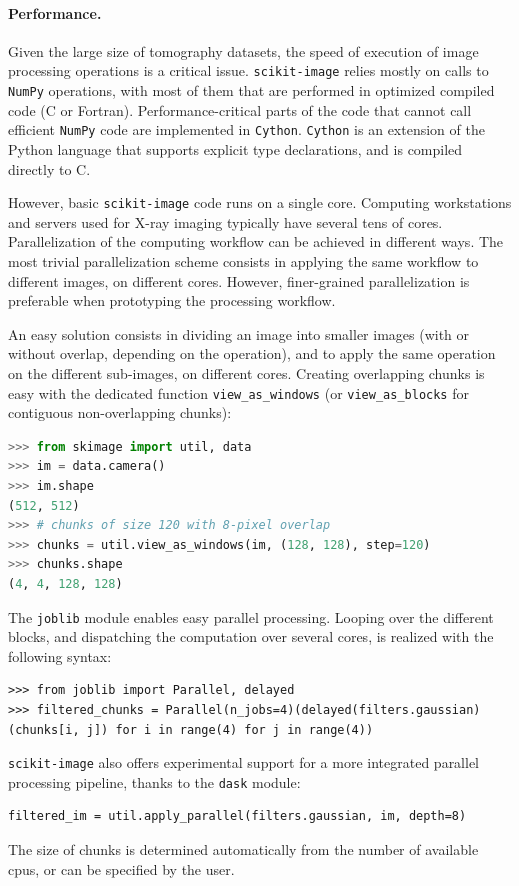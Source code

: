 \documentclass[twocolumn]{bmcart}%
\begin{document}
\paragraph{Performance.}

Given the large size of tomography datasets, the speed of execution of image
processing operations is a critical issue. \texttt{scikit-image} relies mostly
on calls to \texttt{NumPy} operations, with most of them that are performed in
optimized compiled code (C or Fortran). Performance-critical parts of the code
that cannot call efficient \texttt{NumPy} code are implemented in
\texttt{Cython}. \texttt{Cython} \citep{Behnel2011} is an extension of the
Python language that supports explicit type declarations, and is compiled
directly to C. 

However, basic \texttt{scikit-image} code runs on a single core. Computing
workstations and servers used for X-ray imaging typically have several tens of
cores. Parallelization of the computing workflow can be achieved in different
ways. The most trivial parallelization scheme consists in applying the same
workflow to different images, on different cores. However, finer-grained
parallelization is preferable when prototyping the processing workflow.


An easy solution consists in dividing an image into smaller images (with
or without overlap, depending on the operation), and to apply the
same operation on the different sub-images, on different cores. Creating overlapping chunks is easy with the dedicated function \texttt{view\_as\_windows} (or \texttt{view\_as\_blocks} for contiguous non-overlapping chunks):
\begin{lstlisting}[language=Python]
>>> from skimage import util, data
>>> im = data.camera()
>>> im.shape
(512, 512)
>>> # chunks of size 120 with 8-pixel overlap
>>> chunks = util.view_as_windows(im, (128, 128), step=120)
>>> chunks.shape
(4, 4, 128, 128)
\end{lstlisting}
The \texttt{joblib} module enables easy parallel processing. Looping over the different blocks, and dispatching the computation over several cores, is realized with the following syntax:  
\begin{lstlisting}
>>> from joblib import Parallel, delayed
>>> filtered_chunks = Parallel(n_jobs=4)(delayed(filters.gaussian)(chunks[i, j]) for i in range(4) for j in range(4))
\end{lstlisting}
\texttt{scikit-image} also offers experimental support for a more integrated parallel processing pipeline, thanks to the \texttt{dask} \citep{dask} module:
\begin{lstlisting}
filtered_im = util.apply_parallel(filters.gaussian, im, depth=8)
\end{lstlisting}
The size of chunks is determined automatically from the number of available cpus, or can be specified by the user.
\end{document}
